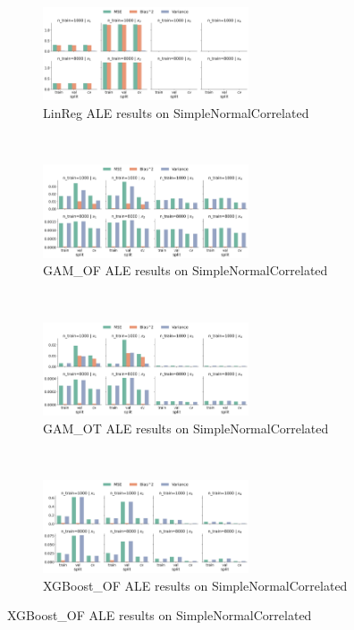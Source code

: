 \documentclass[runningheads]{llncs}
\begin{document}
\begin{figure}[h!]
    \centering
    \begin{subfigure}[b]{\textwidth}
        \centering
        \includegraphics[width=0.67\textwidth]{img/SNC-all/feature_effect_errors_ale_LinReg.png}
        \caption{LinReg ALE results on SimpleNormalCorrelated}
    \end{subfigure}
    \\[10pt]
    \vfill
    \begin{subfigure}[b]{\textwidth}
        \centering
        \includegraphics[width=0.67\textwidth]{img/SNC-all/feature_effect_errors_ale_GAM_OF.png}
        \caption{GAM\_OF ALE results on SimpleNormalCorrelated}
    \end{subfigure}
    \\[10pt]
    \vfill
    \begin{subfigure}[b]{\textwidth}
        \centering
        \includegraphics[width=0.67\textwidth]{img/SNC-all/feature_effect_errors_ale_GAM_OT.png}
        \caption{GAM\_OT ALE results on SimpleNormalCorrelated}
    \end{subfigure}
    \\[10pt]
    \vfill
    \begin{subfigure}[b]{\textwidth}
        \centering
        \includegraphics[width=0.67\textwidth]{img/SNC-all/feature_effect_errors_ale_XGBoost_OF.png}
        \caption{XGBoost\_OF ALE results on SimpleNormalCorrelated}
    \end{subfigure}
\end{figure}
\end{document}
